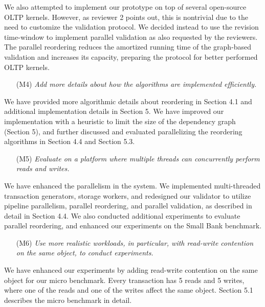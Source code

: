 \documentclass{article}
\begin{document}
We also attempted to implement our prototype on top of several open-source OLTP kernels. However, as reviewer 2 points out, this is nontrivial due to the need to customize the validation protocol. We decided instead to use the revision time-window to implement parallel validation as also requested by the reviewers. The parallel reordering reduces the amortized running time of the graph-based validation and increases its capacity, preparing the protocol for better performed OLTP kernels.

\begin{itemize}
\item[(M4)]  \emph{Add more details about how the algorithms are implemented efficiently.}
\end{itemize}
\vspace{-1em}
We have provided more algorithmic details about reordering in Section 4.1 and additional implementation details in Section 5. We have improved our implementation with a heuristic to limit the size of the dependency graph (Section 5), and further discussed and evaluated parallelizing the reordering algorithms in Section 4.4 and Section 5.3. 

\begin{itemize}
\item[(M5)]  \emph{Evaluate on a platform where multiple threads can concurrently perform reads and writes.}
\end{itemize}
\vspace{-1em}
We have enhanced the parallelism in the system. We implemented multi-threaded transaction generators, storage workers, and redesigned our validator to utilize pipeline parallelism, parallel reordering, and parallel validation, as described in detail in Section 4.4. We also conducted additional experiments to evaluate parallel reordering, and enhanced our experiments on the Small Bank benchmark.

\begin{itemize}
\item[(M6)] \emph{Use more realistic workloads, in particular, with read-write contention on the same object, to conduct experiments.}
\end{itemize}
\vspace{-1em}
We have enhanced our experiments by adding read-write contention on the same object for our micro benchmark. Every transaction has 5 reads and 5 writes, where one of the reads and one of the writes affect the same object. Section 5.1 describes the micro benchmark in detail.
\end{document}
